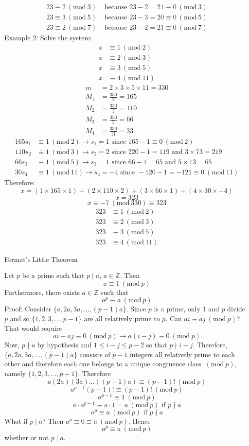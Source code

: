 \documentclass[12pt]{article}
\newcommand{\Mod}[1] {\ (\text{mod}\ #1)}
\begin{document}
$$\begin{aligned} 23 \equiv 2 \Mod{3} &\text{ because } 23 - 2 = 21 \equiv 0 \Mod{3} \\ 23 \equiv 3 \Mod{5} &\text{ because } 23 - 3 = 20 \equiv 0 \Mod{5} \\ 23 \equiv 2 \Mod{7} &\text{ because } 23 - 2 = 21 \equiv 0 \Mod{7} \end{aligned} $$ \newpage 
Example 2: Solve the system: $$\begin{aligned} x &\equiv 1 \Mod{2} \\ x &\equiv 2 \Mod{3} \\ x &\equiv 3 \Mod{5} \\ x &\equiv 4 \Mod{11} \end{aligned} $$ 
$$\begin{aligned} m &= 2 \times 3 \times 5 \times 11 = 330 \\ M_1 &= \frac{330}{2} = 165 \\ M_2 &= \frac{330}{3} = 110 \\ M_3 &= \frac{330}{5} = 66 \\ M_4 &= \frac{330}{11} = 33 \end{aligned} $$ 
$$\begin{aligned} 165s_1 &\equiv 1 \Mod{2} \rightarrow s_1 = 1 \text{ since } 165 - 1 \equiv 0 \Mod{2} \\ 
110s_2 &\equiv 1 \Mod{3} \rightarrow s_2 = 2 \text{ since } 220 - 1= 119 \text{ and } 3 \times 73 = 219 \\
66s_3 &\equiv 1 \Mod{5} \rightarrow s_3 = 1 \text{ since } 66 - 1 = 65 \text{ and } 5 \times 13 = 65 \\ 
30s_4 &\equiv 1 \Mod{11} \rightarrow s_4 = -4 \text{ since } -120 - 1 = -121 \equiv 0 \Mod{11} \end{aligned} $$ 
Therefore: $$x = (1\times165\times1) + (2\times110\times2) + (3\times66\times1) + (4\times30\times-4) $$ $$x = 323$$ $$x \equiv -7 \Mod{330} \equiv 323$$ 
$$\begin{aligned} 323 &\equiv 1 \Mod{2} \\ 323 &\equiv 2 \Mod{3} \\ 323 &\equiv 3 \Mod{5} \\ 323 &\equiv 4 \Mod{11} \end{aligned} $$ \newpage 
\begin{center} Fermat's Little Theorem \end{center}
Let $p$ be a prime such that $p \mid a$, $a \in \mathbb{Z}$. Then $$a \equiv 1 \Mod{p}$$ Furthermore, there exists $a \in \mathbb{Z}$ such that $$a^p \equiv a \Mod{p} $$ Proof: Consider $\{a, 2a, 3a, \dots, (p -1)a\}$. Since $p$ is a prime, only 1 and $p$ divide $p$ and so $\{1, 2, 3, \dots, p -1\}$ are all relatively prime to $p$. Can $ai \equiv aj \Mod{p}$? That would require $$ai - aj \equiv 0 \Mod{p} \rightarrow a(i - j) \equiv 0 \Mod{p} $$ Now, $p \nmid a$ by hypothesis and $1 \leq i - j \leq p - 2$ so that $p \nmid i - j$. Therefore, $\{a, 2a, 3a, \dots, (p - 1)a\}$ consists of $p - 1$ integers all relatively prime to each other and therefore each one belongs to a unique congruence class $\Mod{p}$, namely $\{1, 2, 3, \dots, p - 1\}$. Therefore $$a(2a)(3a)\dots((p - 1)a) \equiv (p - 1)! \Mod{p} $$ $$a^{p - 1}(p - 1)! \equiv (p - 1)! \Mod{p} $$
$$a^{p - 1} \equiv 1 \Mod{p} $$ $$a\cdot a^{p - 1} \equiv a \cdot 1 = a \Mod{p} \text{ if } p \nmid a $$ $$a^p \equiv a \Mod{p} \text{ if } p \nmid a $$ 
What if $p \mid a$? Then $a^p \equiv 0 \equiv a \Mod{p}$. Hence $$a^p \equiv a \Mod{p} $$ whether or not $p\mid a$. 
\end{document}
